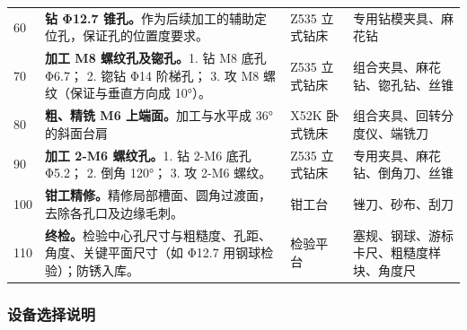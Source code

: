 \documentclass[12pt,a4paper,fontset=none]{ctexart}
\begin{document}
\begin{table}[H]
\begin{tabular}{p{1.5cm} p{6.5cm} p{3cm} p{3cm}}
            60  & \textbf{钻 Φ12.7 锥孔。}\newline{}作为后续加工的辅助定位孔，保证孔的位置度要求。 \newline{}                                                                                              & Z535 立式钻床    & 专用钻模夹具、麻花钻           \\
            70  & \textbf{加工 M8 螺纹孔及锪孔。}\newline{}1. 钻 M8 底孔 Φ6.7； \newline{}2. 锪钻 Φ14 阶梯孔； \newline{}3. 攻 M8 螺纹（保证与垂直方向成 10°）。 \newline{}& Z535 立式钻床 & 组合夹具、麻花钻、锪孔钻、丝锥 \\
            80  & \textbf{粗、精铣 M6 上端面。}\newline{}加工与水平成 36° 的斜面台肩 \newline{}                                                                                                    & X52K 卧式铣床    & 组合夹具、回转分度仪、端铣刀       \\
            90  & \textbf{加工 2-M6 螺纹孔。}\newline{}1. 钻 2-M6 底孔 Φ5.2； \newline{}2. 倒角 120°； \newline{}3. 攻 2-M6 螺纹。 \newline{}& Z535 立式钻床 & 专用夹具、麻花钻、倒角刀、丝锥 \\
            100 & \textbf{钳工精修。}\newline{}精修局部槽面、圆角过渡面，去除各孔口及边缘毛刺。 \newline{}                                                                                                   & 钳工台          & 锉刀、砂布、刮刀             \\
            110 & \textbf{终检。}\newline{}检验中心孔尺寸与粗糙度、孔距、角度、关键平面尺寸（如 Φ12.7 用钢球检验）；防锈入库。\newline{} & 检验平台 & 塞规、钢球、游标卡尺、粗糙度样块、角度尺 \\
            \bottomrule
        \end{tabular}\label{tab:table}
    \end{table}

    \subsubsection{设备选择说明}
\end{document}
